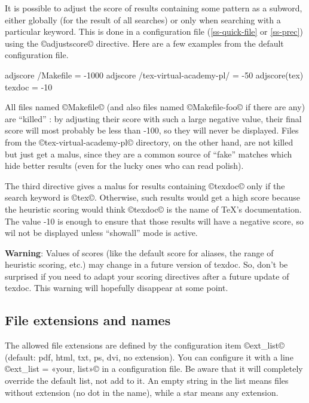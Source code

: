 \documentclass[a4paper, oneside]{scrartcl}
\makeatletter
\newcommand\tex{\TeX\xspace}
\newenvironment{htcode}{%
  \SaveVerbatim[samepage, gobble=2]{verbmat}%
  }{%
  \endSaveVerbatim
  \par\medskip\noindent\hspace*{\parindent}%
  \BUseVerbatim{verbmat}%
  \par\medskip\@endpetrue}
\makeatother
\begin{document}
It is possible to adjust the score of results containing some pattern as a
subword, either globally (for the result of all searches) or only when
searching with a particular keyword. This is done in a configuration file
(\ref{ss-quick-file} or \ref{ss-prec}) using the ©adjustscore© directive. Here
are a few examples from the default configuration file.

\begin{htcode}
  adjscore /Makefile = -1000
  adjscore /tex-virtual-academy-pl/ = -50
  adjscore(tex) texdoc = -10
\end{htcode}

All files named ©Makefile© (and also files named ©Makefile-foo© if there are
any) are ``killed'' : by adjusting their score with such a large negative
value, their final score will most probably be less than -100, so they will
never be displayed. Files from the ©tex-virtual-academy-pl© directory, on the
other hand, are not killed but just get a malus, since they are a common
source of ``fake'' matches which hide better results (even for the lucky ones
who can read polish).

The third directive gives a malus for results containing ©texdoc© only if the
search keyword is ©tex©. Otherwise, such results would get a high score
because the heuristic scoring would think ©texdoc© is the name of \tex's
documentation. The value -10 is enough to ensure that those results will have
a negative score, so wil not be displayed unless ``showall'' mode is active.

\textbf{Warning}: Values of scores (like the default score for aliases, the
range of heuristic scoring, etc.) may change in a future version of texdoc.
So, don't be surprised if you need to adapt your scoring directives after a
future update of texdoc.  This warning will hopefully disappear at some point.

\subsection{File extensions and names}\label{ss-ext}

The allowed file extensions are defined by the configuration item ©ext_list©
(default: pdf, html, txt, ps, dvi, no extension). You can configure it with
a line ©ext_list = «your, list»© in a configuration file. Be aware
that it will completely override the default list, not add to it. An empty
string in the list means files without extension (no dot in the name), while a
star means any extension.
\end{document}
